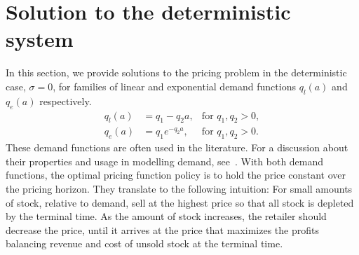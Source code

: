 \documentclass[main.tex]{subfiles}
\begin{document}
\section{Solution to the deterministic
  system}\label{sec:deterministic_hjb}
In this section, we provide solutions to the pricing problem in the
deterministic case, $\sigma = 0$, for families of linear and exponential
demand functions $q_l(a)$ and $q_e(a)$ respectively.
\begin{align}
  q_l(a)&=q_1-q_2a,&\text{for } q_1,q_2>0,\\
  q_e(a)&=q_1e^{-q_2a},&\text{for } q_1,q_2>0.
\end{align}
These demand functions are often used in the literature. For a discussion
about their properties and usage in modelling demand, see~\cite[Ch.~7]{talluri2006theory}.
With both demand functions, the optimal pricing function policy is to hold the
price constant over the pricing horizon. They translate to the
following intuition: For small amounts of stock, relative to demand,
sell at the highest price so that all stock is depleted by the
terminal time. As the amount of stock increases, the retailer should
decrease the price, until it arrives at the price that maximizes the
profits balancing revenue and cost of unsold stock at the terminal
time.
\end{document}
